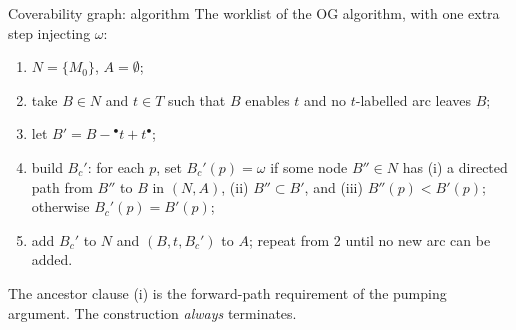 \begin{definitionbox}{Coverability graph: algorithm}
The worklist of the OG algorithm, with one extra step injecting $\omega$:
\begin{enumerate}
  \item $N = \{M_0\}$, $A = \emptyset$;
  \item take $B \in N$ and $t \in T$ such that $B$ enables $t$ and no $t$-labelled arc leaves $B$;
  \item let $B' = B - {}^\bullet t + t^\bullet$;
  \item build $B_c'$: for each $p$, set $B_c'(p) = \omega$ if some node $B'' \in N$ has (i) a directed path from $B''$ to $B$ in $(N, A)$, (ii) $B'' \subset B'$, and (iii) $B''(p) < B'(p)$; otherwise $B_c'(p) = B'(p)$;
  \item add $B_c'$ to $N$ and $(B, t, B_c')$ to $A$; repeat from 2 until no new arc can be added.
\end{enumerate}
The ancestor clause (i) is the forward-path requirement of the pumping argument. The construction \emph{always} terminates.
\end{definitionbox}

